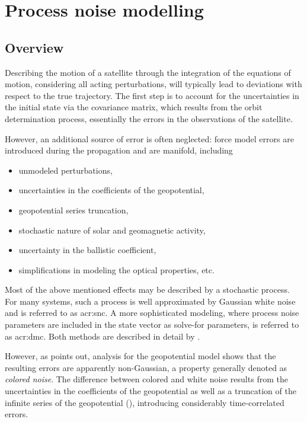 \section{Process noise modelling}
\label{sec:noise}

\subsection{Overview}

Describing the motion of a satellite through the integration of the equations of motion, considering all acting perturbations, will typically lead to
deviations with respect to the true trajectory. The first step is to account for the uncertainties in the initial state via the covariance matrix, which results from the orbit
determination process, essentially the errors in the observations of the satellite.

However, an additional source of error is often neglected: force model errors are introduced during the propagation and are manifold, including
\begin{itemize}
 \item unmodeled perturbations,
 \item uncertainties in the coefficients of the geopotential,
 \item geopotential series truncation,
 \item stochastic nature of solar and geomagnetic activity,
 \item uncertainty in the ballistic coefficient,
 \item simplifications in modeling the optical properties, etc.
\end{itemize}
Most of the above mentioned effects may be described by a stochastic process. For many systems, such a process is well approximated by Gaussian white noise and is referred to 
as \gls{acr:snc}. A more sophisticated modeling, where process noise parameters are included in the state vector as solve-for parameters, is referred to as \gls{acr:dmc}. 
Both methods are described in detail by \citet{tapley2004}.

However, as \cite{nazarenko2010} points out, analysis for the geopotential model shows that the resulting errors are apparently non-Gaussian, a property generally denoted as
\textit{colored noise}. The difference between colored and white noise results from the uncertainties in the coefficients of the geopotential as well as a truncation of the
infinite series of the geopotential (), introducing considerably time-correlated errors.

